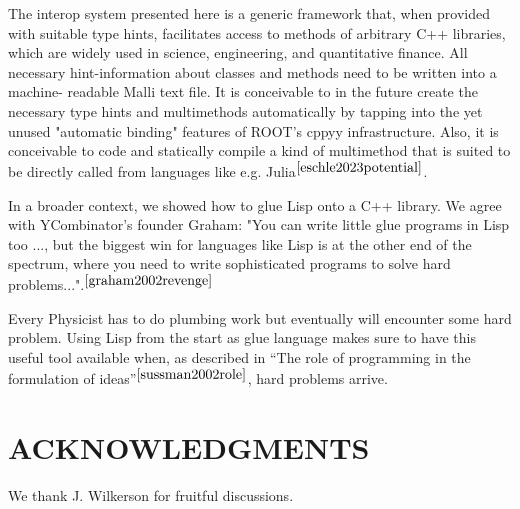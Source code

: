 \documentclass[twocolumn]{article}
\begin{document}
The interop system presented here is a generic framework that, when provided with suitable type hints, facilitates access to methods of arbitrary C++ libraries, which are widely used in science, engineering, and quantitative finance. All necessary hint-information about classes and methods need to be written into a machine- readable Malli text file. It is conceivable to in the future create the necessary type hints and multimethods automatically by tapping into the yet unused "automatic binding" features of ROOT's cppyy infrastructure. Also, it is conceivable to code and statically compile a kind of multimethod that is suited to be directly called from languages like e.g. Julia$^{\cite{eschle2023potential}}$.

In a broader context, we showed how to glue Lisp onto a C++ library. We agree with YCombinator's founder Graham: "You can write little glue programs in Lisp too ..., but the biggest win for languages like Lisp is at the other end of the spectrum, where you need to write sophisticated programs to solve hard problems...".$^{\cite{graham2002revenge}}$

Every Physicist has to do plumbing work but eventually will encounter some  hard problem. Using Lisp from the start as glue language makes sure to have this useful tool available when, as described in “The role of programming in the formulation of ideas”$^{\cite{sussman2002role}}$, hard problems arrive.

\section{ACKNOWLEDGMENTS}
We thank J. Wilkerson for fruitful discussions.




\end{document}
